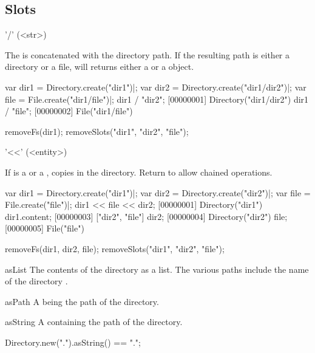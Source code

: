 \subsection{Slots}
\begin{urbiscriptapi}
\item['/'](<str>)
  \experimental{}

  The   is concatenated with the directory path.
  If the resulting path is either a directory or a file,  will
  returns either a  or a  object.
\begin{urbiscript}
var dir1 = Directory.create("dir1")|;
var dir2 = Directory.create("dir1/dir2")|;
var file = File.create("dir1/file")|;
dir1 / "dir2";
[00000001] Directory("dir1/dir2")
dir1 / "file";
[00000002] File("dir1/file")
\end{urbiscript}
\begin{urbicomment}
removeFs(dir1);
removeSlots("dir1", "dir2", "file");
\end{urbicomment}


\item['<<'](<entity>)
  \experimental{}

  If  is a  or a ,
   copies  in the \this directory.
  Return \this to allow chained operations.
\begin{urbiscript}
var dir1 = Directory.create("dir1")|;
var dir2 = Directory.create("dir2")|;
var file = File.create("file")|;
dir1 << file << dir2;
[00000001] Directory("dir1")
dir1.content;
[00000003] ["dir2", "file"]
dir2;
[00000004] Directory("dir2")
file;
[00000005] File("file")
\end{urbiscript}
\begin{urbicomment}
removeFs(dir1, dir2, file);
removeSlots("dir1", "dir2", "file");
\end{urbicomment}


\item[asList]
  The contents of the directory as a  list.  The
  various paths include the name of the directory \this.


\item[asPath] A  being the path of the directory.


\item[asString] A  containing the path of the directory.
\begin{urbiassert}
Directory.new(".").asString() == ".";
\end{urbiassert}



\end{urbiscriptapi}
